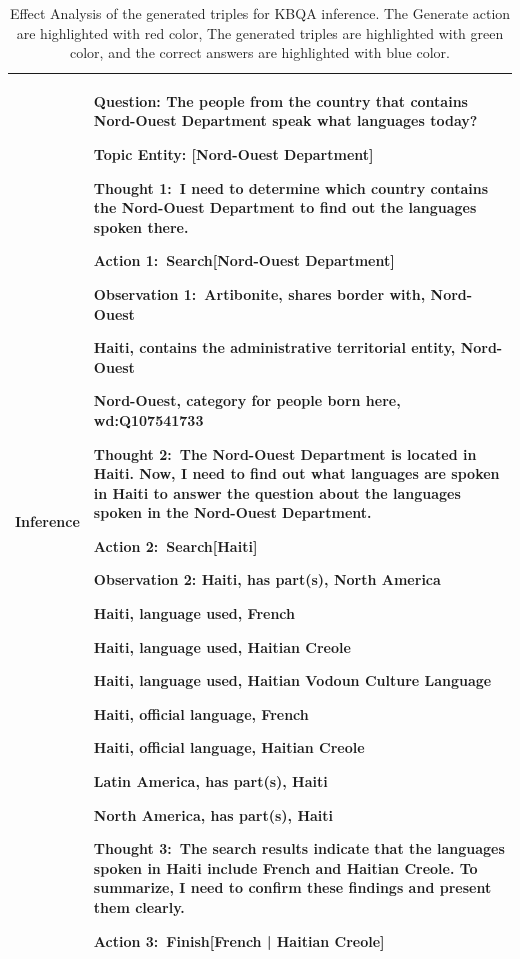 \begin{table}[ht!]
\begin{tabular}{>{\hspace{0pt}}m{0.1\linewidth}|>{\hspace{0pt}}m{0.9\linewidth}}
\hline
\rowcolor[rgb]{0.9490,0.9490,0.9490} Inference  & Question: The people from the country that contains Nord-Ouest Department speak what languages today?\par{}Topic Entity: [Nord-Ouest Department]\par\null\par{}Thought 1:~I need to determine which country contains the Nord-Ouest Department to find out the languages spoken there.\par{}Action 1:~Search[Nord-Ouest Department]\par{}Observation 1:~Artibonite, shares border with, Nord-Ouest\par{}Haiti, contains the administrative territorial entity, Nord-Ouest\par{}Nord-Ouest, category for people born here, wd:Q107541733\par\null\par{}Thought 2:~The Nord-Ouest Department is located in Haiti. Now, I need to find out what languages are spoken in Haiti to answer the question about the languages spoken in the Nord-Ouest Department.\par{}Action 2:~Search[Haiti]\par{}Observation 2: Haiti, has part(s), North America\par{}\textcolor[rgb]{0.4549,0.7137,0.0078}{Haiti, language used, French}\par{}Haiti, language used, Haitian Creole\par{}Haiti, language used, Haitian Vodoun Culture Language\par{}\textcolor[rgb]{0.4549,0.7137,0.0078}{Haiti, official language, French}\par{}Haiti, official language, \textcolor[rgb]{0,0.4392,0.7529}{Haitian Creole}\par{}Latin America, has part(s), Haiti\par{}North America, has part(s), Haiti\par\null\par{}Thought 3:~The search results indicate that the languages spoken in Haiti include French and Haitian Creole. To summarize, I need to confirm these findings and present them clearly.\par{}Action 3:~Finish[\textcolor[rgb]{0,0.4392,0.7529}{French} | \textcolor[rgb]{0,0.4392,0.7529}{Haitian Creole}]  \\
\hline
\end{tabular}
\caption{Effect Analysis of the generated triples for KBQA inference. The \textcolor[rgb]{0.7529,0,0}{Generate action} are highlighted with red color, The \textcolor[rgb]{0.4549,0.7137,0.0078}{generated triples} are highlighted with green color, and the \textcolor[rgb]{0,0.4392,0.7529}{correct answers} are highlighted with blue color.}
\label{tab:cmp_t5}
\end{table}
\renewcommand{\arraystretch}{1}